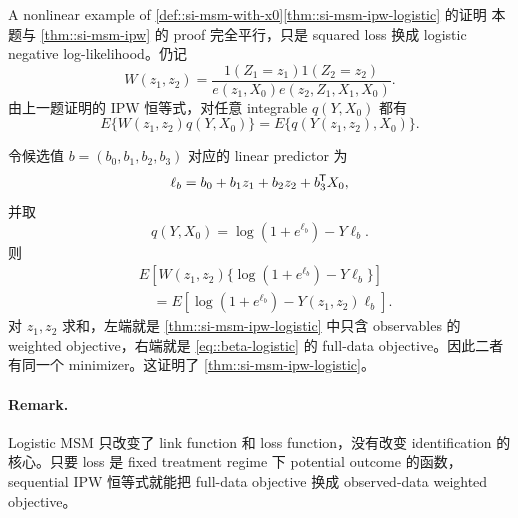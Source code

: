 \begin{exercisesolution}{A nonlinear example of \cref{def::si-msm-with-x0}}{\cref{thm::si-msm-ipw-logistic} 的证明}
本题与 \cref{thm::si-msm-ipw} 的 proof 完全平行，只是 squared loss 换成 logistic negative log-likelihood。仍记
\[
W(z_1,z_2)
=
\frac{1(Z_1=z_1)1(Z_2=z_2)}
{e(z_1,X_0)e(z_2,Z_1,X_1,X_0)}.
\]
由上一题证明的 IPW 恒等式，对任意 integrable $q(Y,X_0)$ 都有
\[
E\{W(z_1,z_2)q(Y,X_0)\}
=
E\{q(Y(z_1,z_2),X_0)\}.
\]

令候选值 $b=(b_0,b_1,b_2,b_3)$ 对应的 linear predictor 为
\[
\ell_b=b_0+b_1z_1+b_2z_2+b_3^{\mkern-1.5mu\mathsf{T}} X_0,
\]
并取
\[
q(Y,X_0)=\log(1+e^{\ell_b})-Y\ell_b.
\]
则
\begin{align*}
&E\left[
W(z_1,z_2)\{\log(1+e^{\ell_b})-Y\ell_b\}
\right]\\
&\quad =
E\left[
\log(1+e^{\ell_b})-Y(z_1,z_2)\ell_b
\right].
\end{align*}
对 $z_1,z_2$ 求和，左端就是 \cref{thm::si-msm-ipw-logistic} 中只含 observables 的 weighted objective，右端就是 \cref{eq::beta-logistic} 的 full-data objective。因此二者有同一个 minimizer。这证明了 \cref{thm::si-msm-ipw-logistic}。

\paragraph{Remark.}
Logistic MSM 只改变了 link function 和 loss function，没有改变 identification 的核心。只要 loss 是 fixed treatment regime 下 potential outcome 的函数，sequential IPW 恒等式就能把 full-data objective 换成 observed-data weighted objective。
\end{exercisesolution}

